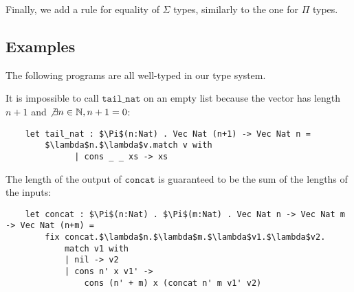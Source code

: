 \documentclass[acmsmall,nonacm]{acmart}
\begin{document}
\noindent
Finally, we add a rule for equality of $\Sigma$ types, similarly to the one for $\Pi$ types.
\begin{inferences}
\end{inferences}




\subsection{Examples} \label{sec:examples}

The following programs are all well-typed in our type system.

It is impossible to call $\texttt{tail\_nat}$ on an empty list because the vector has length $n + 1$ and $\not\exists n \in \mathbb{N} , n + 1 = 0$:
\begin{lstlisting}
    let tail_nat : $\Pi$(n:Nat) . Vec Nat (n+1) -> Vec Nat n =
        $\lambda$n.$\lambda$v.match v with
              | cons _ _ xs -> xs
\end{lstlisting}

\noindent
The length of the output of $\texttt{concat}$ is guaranteed to be the sum of the lengths of the inputs:

\begin{lstlisting}
    let concat : $\Pi$(n:Nat) . $\Pi$(m:Nat) . Vec Nat n -> Vec Nat m -> Vec Nat (n+m) =
        fix concat.$\lambda$n.$\lambda$m.$\lambda$v1.$\lambda$v2.
            match v1 with
            | nil -> v2
            | cons n' x v1' ->
                cons (n' + m) x (concat n' m v1' v2)
\end{lstlisting}
\end{document}
